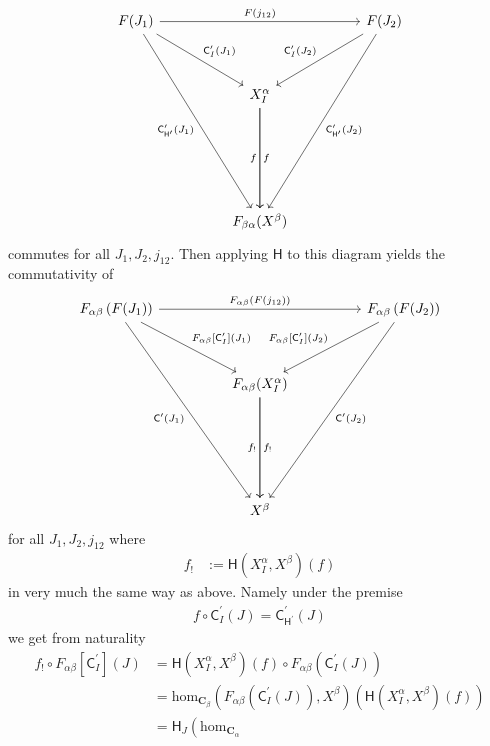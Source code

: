 \begin{prf}
\[\begin{tikzcd}[sep=huge]
  F(J_{1})
  \arrow{rr}{F(j_{12})}
  \arrow{dr}{\mathsf{C}_{I}^{\prime}(J_{1})}
  \arrow[swap]{dddr}{\mathsf{C}_{\mathsf{H}^{\prime}}^{\prime}(J_{1})}
  &
  &
  F(J_{2})
  \arrow{dddl}{\mathsf{C}_{\mathsf{H}^{\prime}}^{\prime}(J_{2})}
  \arrow[swap]{dl}{\mathsf{C}_{I}^{\prime}(J_{2})}
  \\
  &
  X_{I}^{\alpha}
  \arrow{dd}{f}
  \arrow[swap]{dd}{f}
  &
  \\
  \\
  &
  F_{\beta\alpha}(X^{\beta})
  &
\end{tikzcd}
\]
commutes for all $J_{1},J_{2},j_{12}$. Then applying $\mathsf{H}$ to this diagram yields the commutativity of
\[
\begin{tikzcd}[sep=huge]
  F_{\alpha\beta}
  \left(
    F(J_{1})
  \right)
  \arrow{rr}{F_{\alpha\beta}(F(j_{12}))}
  \arrow{dr}{F_{\alpha\beta}[\mathsf{C}_{I}^{\prime}](J_{1})}
  \arrow[swap]{dddr}{\mathsf{C}^{\prime}(J_{1})}
  &
  &
  F_{\alpha\beta}
  \left(
    F(J_{2})
  \right)
  \arrow{dddl}{\mathsf{C}^{\prime}(J_{2})}
  \arrow[swap]{dl}{F_{\alpha\beta}[\mathsf{C}_{I}^{\prime}](J_{2})}
  \\
  &
  F_{\alpha\beta}(X_{I}^{\alpha})
  \arrow{dd}{f_{!}}
  \arrow[swap]{dd}{f_{!}}
  &
  \\
  \\
  &
  X^{\beta}
  &
\end{tikzcd}
\]
for all $J_{1},J_{2},j_{12}$ where
\begin{align*}
  f_{!}
  &:=
  \mathsf{H}
  \left(
    X_{I}^{\alpha},
    X^{\beta}
  \right)
  (f)
\end{align*}
in very much the same way as above. Namely under the premise
\begin{align*}
  f
  \circ
  \mathsf{C}_{I}^{\prime}(J)
  =
  \mathsf{C}_{\mathsf{H}^{\prime}}^{\prime}(J)
\end{align*}
we get from naturality
\begin{align*}
  f_{!}
  \circ
  F_{\alpha\beta}[\mathsf{C}_{I}^{\prime}](J)
  &=
  \mathsf{H}
  \left(
    X_{I}^{\alpha},
    X^{\beta}
  \right)
  (f)
  \circ
  F_{\alpha\beta}
  \left(
    \mathsf{C}_{I}^{\prime}(J)
  \right)
  \\
  &=
  \mathrm{hom}_{\mathbf{C}_{\beta}}
  \left(
    F_{\alpha\beta}
    \left(
      \mathsf{C}_{I}^{\prime}(J)
    \right),
    X^{\beta}
  \right)
  \left(
    \mathsf{H}
    \left(
      X_{I}^{\alpha},
      X^{\beta}
    \right)(f)
  \right)
  \\
  &=
  \mathsf{H}_{J}
  \left(
    \mathrm{hom}_{\mathbf{C}_{\alpha}}

\end{align*}
\end{prf}
